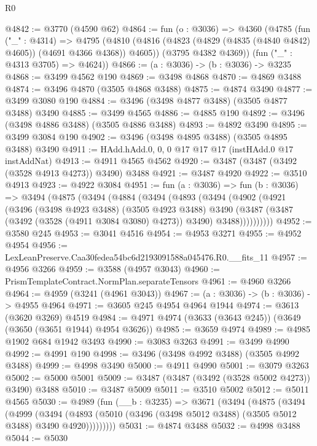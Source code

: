 \begin{lexlean}{R0}
\begin{coremodule}
@4842 := @3770 (@4590 @62)
@4864 := fun (o : @3036) =>
  @4360
    (@4785
      (fun ("_" : @4314) =>
      @4795
        (@4810 (@4816 (@4823 (@4829 (@4835 (@4840 @4842) @4605)) (@4691 @4366 @4368)) @4605))
        (@3795 @4382 @4369))
      (fun ("_" : @4313 @3705) => @4624))
@4866 := (a : @3036) -> (b : @3036) -> @3235
@4868 := @3499 @4562 @190
@4869 := @3498 @4868
@4870 := @4869 @3488
@4874 := @3496 @4870 (@3505 @4868 @3488)
@4875 := @4874 @3490
@4877 := @3499 @3080 @190
@4884 := @3496 (@3498 @4877 @3488) (@3505 @4877 @3488) @3490
@4885 := @3499 @4565
@4886 := @4885 @190
@4892 := @3496 (@3498 @4886 @3488) (@3505 @4886 @3488)
@4893 := @4892 @3490
@4895 := @3499 @3084 @190
@4902 := @3496 (@3498 @4895 @3488) (@3505 @4895 @3488) @3490
@4911 := HAdd.hAdd.{0, 0, 0} @17 @17 @17 (instHAdd.{0} @17 instAddNat)
@4913 := @4911 @4565 @4562
@4920 := @3487 (@3487 (@3492 (@3528 @4913 @4273)) @3490) @3488
@4921 := @3487 @4920
@4922 := @3510 @4913
@4923 := @4922 @3084
@4951 := fun (a : @3036) =>
  fun (b : @3036) =>
  @3494
    (@4875
      (@3494
        (@4884
          (@3494
            (@4893
              (@3494
                (@4902
                  (@4921
                    (@3496
                      (@3498 @4923 @3488)
                      (@3505 @4923 @3488)
                      @3490
                      (@3487 (@3487 (@3492 (@3528 (@4911 @3084 @3080) @4273)) @3490) @3488))))))))))
@4952 := @3580 @245
@4953 := @3041 @4516
@4954 := @4953 @3271
@4955 := @4952 @4954
@4956 := LexLeanPreserve.Caa30fedea54bc6d2193091588a045476.R0.__fits_11
@4957 := @4956 @3266
@4959 := @3588 (@4957 @3043)
@4960 := PrismTemplateContract.NormPlan.separateTensors
@4961 := @4960 @3266
@4964 := @4959 (@3241 (@4961 @3043))
@4967 := (a : @3036) -> (b : @3036) -> @4955 @4964
@4971 := @3605 @245 @4954 @4964 @1944
@4974 := @3613 (@3620 @3269) @4519
@4984 := @4971 @4974 (@3633 (@3643 @245)) (@3649 (@3650 (@3651 @1944) @4954 @3626))
@4985 := @3659 @4974
@4989 := @4985 @1902 @684 @1942 @3493
@4990 := @3083 @3263
@4991 := @3499 @4990
@4992 := @4991 @190
@4998 := @3496 (@3498 @4992 @3488) (@3505 @4992 @3488)
@4999 := @4998 @3490
@5000 := @4911 @4990
@5001 := @3079 @3263
@5002 := @5000 @5001
@5009 := @3487 (@3487 (@3492 (@3528 @5002 @4273)) @3490) @3488
@5010 := @3487 @5009
@5011 := @3510 @5002
@5012 := @5011 @4565
@5030 := @4989
    (fun (__b : @3235) =>
    @3671
      (@3494
        (@4875
          (@3494
            (@4999
              (@3494
                (@4893 (@5010 (@3496 (@3498 @5012 @3488) (@3505 @5012 @3488) @3490 @4920)))))))))
@5031 := @4874 @3488
@5032 := @4998 @3488
@5044 := @5030

\end{coremodule}
\end{lexlean}
